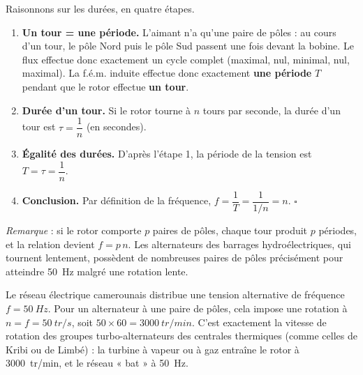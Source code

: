 \documentclass[11pt]{article}
\begin{document}
\begin{experience}[Démonstration guidée : pourquoi $f = n$ ?]
Raisonnons sur les durées, en quatre étapes.
\begin{enumerate}
\item \textbf{Un tour = une période.} L'aimant n'a qu'une paire de pôles : au cours d'un tour, le pôle Nord puis le pôle Sud passent une fois devant la bobine. Le flux effectue donc exactement un cycle complet (maximal, nul, minimal, nul, maximal). La f.é.m. induite effectue donc exactement \textbf{une période} $T$ pendant que le rotor effectue \textbf{un tour}.
\item \textbf{Durée d'un tour.} Si le rotor tourne à $n$ tours par seconde, la durée d'un tour est $\tau = \dfrac{1}{n}$ (en secondes).
\item \textbf{Égalité des durées.} D'après l'étape 1, la période de la tension est $T = \tau = \dfrac{1}{n}$.
\item \textbf{Conclusion.} Par définition de la fréquence, $f = \dfrac{1}{T} = \dfrac{1}{1/n} = n$. \hfill$\square$
\end{enumerate}
\textit{Remarque} : si le rotor comporte $p$ paires de pôles, chaque tour produit $p$ périodes, et la relation devient $f = p\,n$. Les alternateurs des barrages hydroélectriques, qui tournent lentement, possèdent de nombreuses paires de pôles précisément pour atteindre \SI{50}{Hz} malgré une rotation lente.
\end{experience}

\begin{exemplebox}
Le réseau électrique camerounais distribue une tension alternative de fréquence $f = \SI{50}{Hz}$. Pour un alternateur à une paire de pôles, cela impose une rotation à $n = f = \SI{50}{tr/s}$, soit $50 \times 60 = \SI{3000}{tr/min}$. C'est exactement la vitesse de rotation des groupes turbo-alternateurs des centrales thermiques (comme celles de Kribi ou de Limbé) : la turbine à vapeur ou à gaz entraîne le rotor à \SI{3000}{tr/min}, et le réseau « bat » à \SI{50}{Hz}.
\end{exemplebox}
\end{document}
